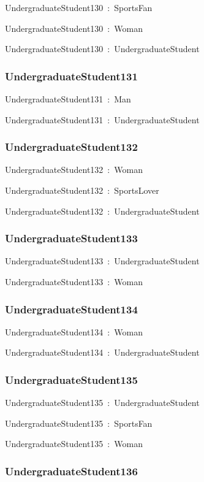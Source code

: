 \documentclass{article}
\begin{document}
UndergraduateStudent130~:~SportsFan

UndergraduateStudent130~:~Woman

UndergraduateStudent130~:~UndergraduateStudent

\subsubsection*{UndergraduateStudent131}

UndergraduateStudent131~:~Man

UndergraduateStudent131~:~UndergraduateStudent

\subsubsection*{UndergraduateStudent132}

UndergraduateStudent132~:~Woman

UndergraduateStudent132~:~SportsLover

UndergraduateStudent132~:~UndergraduateStudent

\subsubsection*{UndergraduateStudent133}

UndergraduateStudent133~:~UndergraduateStudent

UndergraduateStudent133~:~Woman

\subsubsection*{UndergraduateStudent134}

UndergraduateStudent134~:~Woman

UndergraduateStudent134~:~UndergraduateStudent

\subsubsection*{UndergraduateStudent135}

UndergraduateStudent135~:~UndergraduateStudent

UndergraduateStudent135~:~SportsFan

UndergraduateStudent135~:~Woman

\subsubsection*{UndergraduateStudent136}
\end{document}
